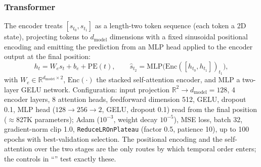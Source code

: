 \documentclass[10pt,letterpaper]{article}
\begin{document}
\subsubsection*{Transformer}
The encoder treats $[s_{t_0},s_{t_1}]$ as a length-two token sequence (each token a 2D state), projecting tokens to $d_{\mathrm{model}}$ dimensions with a fixed sinusoidal positional encoding and emitting the prediction from an MLP head applied to the encoder output at the final position:
\begin{equation}
h_t = W_e s_t + b_e + \mathrm{PE}(t), \qquad
\hat{s}_{t_2} = \mathrm{MLP}\big(\mathrm{Enc}([h_{t_0},h_{t_1}])_{t_1}\big),
\label{eq:transformer}
\end{equation}
with $W_e\in\mathbb{R}^{d_{\mathrm{model}}\times 2}$, $\mathrm{Enc}(\cdot)$ the stacked self-attention encoder, and $\mathrm{MLP}$ a two-layer GELU network. Configuration: input projection $\mathbb{R}^2\!\rightarrow\!d_{\mathrm{model}}{=}128$, 4 encoder layers, 8 attention heads, feedforward dimension 512, GELU, dropout 0.1, MLP head ($128\!\rightarrow\!256\!\rightarrow\!2$, GELU, dropout 0.1) read from the final position ($\approx$827K parameters); Adam ($10^{-3}$, weight decay $10^{-5}$), MSE loss, batch 32, gradient-norm clip 1.0, \texttt{ReduceLROnPlateau} (factor 0.5, patience 10), up to 100 epochs with best-validation selection. The positional encoding and the self-attention over the two stages are the only routes by which temporal order enters; the controls in ``'' test exactly these.
\end{document}
